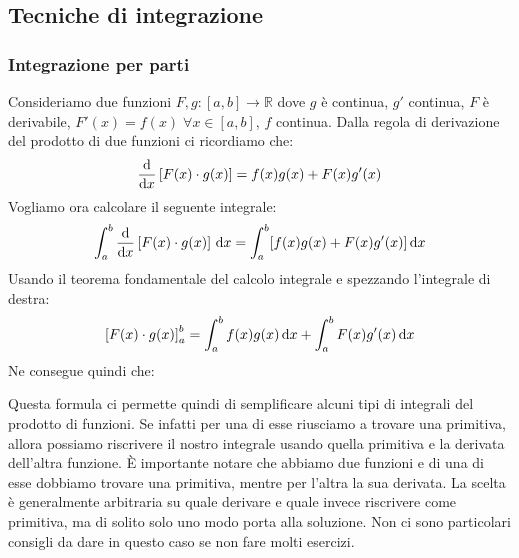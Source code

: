 \subsection{Tecniche di integrazione}
\subsubsection{Integrazione per parti}
Consideriamo due funzioni $F, g:[a,b] \to \mathbb{R}$ dove $g$ è continua, $g'$ continua, $F$ è derivabile, $F'(x) = f(x) \;\forall x \in [a,b]$, $f$ continua. Dalla regola di derivazione del prodotto di due funzioni ci ricordiamo che:
\begin{equation*}
	\dv{}{x} \left[F(x) \cdot g(x)\right] = f(x)g(x) + F(x)g'(x)
\end{equation*}
Vogliamo ora calcolare il seguente integrale:
\begin{equation*}
	\int_a^b \dv{}{x} \left[F(x) \cdot g(x)\right] \,\text{d} x = \int_a^b [f(x)g(x) + F(x)g'(x)] \,\text{d} x
\end{equation*}
Usando il teorema fondamentale del calcolo integrale e spezzando l'integrale di destra:
\begin{equation*}
	\left[F(x) \cdot g(x)\right]_a^b = \int_a^b f(x)g(x) \,\text{d} x + \int_a^b F(x)g'(x) \,\text{d} x
\end{equation*}
Ne consegue quindi che:

Questa formula ci permette quindi di semplificare alcuni tipi di integrali del prodotto di funzioni. Se infatti per una di esse riusciamo a trovare una primitiva, allora possiamo riscrivere il nostro integrale usando quella primitiva e la derivata dell'altra funzione. È importante notare che abbiamo due funzioni e di una di esse dobbiamo trovare una primitiva, mentre per l'altra la sua derivata. La scelta è generalmente arbitraria su quale derivare e quale invece riscrivere come primitiva, ma di solito solo uno modo porta alla soluzione. Non ci sono particolari consigli da dare in questo caso se non fare molti esercizi.\\

